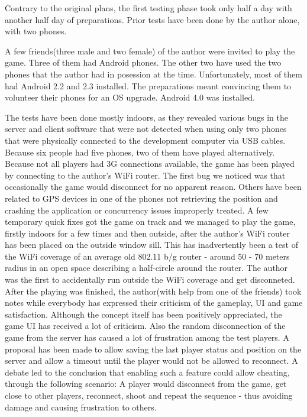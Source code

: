 Contrary to the original plans, the first testing phase took only half a day
with another half day of preparations. Prior tests have been done by the
author alone, with two phones.\newline

A few friends(three male and two female) of the author were invited to play the
game. Three of them had Android phones. The other two have used
the two phones that the author had in posession at the time. Unfortunately, most
of them had Android 2.2 and 2.3 installed. The preparations meant convincing
them to volunteer their phones for an OS upgrade. Android 4.0 was
installed.\newline

The tests have been done mostly indoors, as they revealed various bugs in the
server and client software that were not detected when using only two phones
that were physically connected to the development computer via USB
cables. Because six people had five phones, two of them have played
alternatively. Because not all players had 3G connections available, the game
has been played by connecting to the author's WiFi router. The first bug we
noticed was that occasionally the game would disconnect for no apparent reason.
Others have been related to GPS devices in one of the phones not retrieving the
position and crashing the application or concurrency issues improperly treated.
A few temporary quick fixes got the game on track and we managed to play the
game, firstly indoors for a few times and then outside, after the author's WiFi
router has been placed on the outside window sill. This has inadvertently been a
test of the WiFi coverage of an average old 802.11 b/g router - around 50 - 70
meters radius in an open space describing a half-circle around the router. The
author was the first to accidentally run outside the WiFi coverage and get
disconneted. After the playing was finished, the author(with help from one of
the friends) took notes while everybody has expressed their criticism of the
gameplay, UI and game satisfaction. Although the concept itself has been
positively appreciated, the game UI has received a lot of criticism. Also the
random disconnection of the game from the server has caused a lot of frustration
among the test players. A proposal has been made to allow saving the last
player status and position on the server and allow a timeout until the player
would not be allowed to reconnect. A debate led to the conclusion that
enabling such a feature could allow cheating, through the following scenario: A
player would disconnect from the game, get close to other players, reconnect,
shoot and repeat the sequence - thus avoiding damage and causing frustration to
others. \newline

